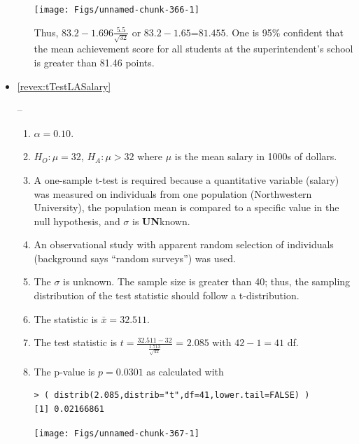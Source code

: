 \documentclass[10pt,openany]{book}\usepackage[]{graphicx}\usepackage[]{color}
\makeatletter
\newenvironment{kframe}{%
 \def\at@end@of@kframe{}%
 \ifinner\ifhmode%
  \def\at@end@of@kframe{\end{minipage}}%
  \begin{minipage}{\columnwidth}%
 \fi\fi%
 \def\FrameCommand##1{\hskip\@totalleftmargin \hskip-\fboxsep
 \colorbox{shadecolor}{##1}\hskip-\fboxsep
     \hskip-\linewidth \hskip-\@totalleftmargin \hskip\columnwidth}%
 \MakeFramed {\advance\hsize-\width
   \@totalleftmargin\z@ \linewidth\hsize
   \@setminipage}}%
 {\par\unskip\endMakeFramed%
 \at@end@of@kframe}
\newenvironment{knitrout}{}{} %
\makeatother
\begin{document}
\begin{itemize}
\begin{enumerate}
\begin{knitrout}
{\centering \texttt{[image: Figs/unnamed-chunk-366-1]} 

}



\end{knitrout}
Thus, $83.2-1.696\frac{5.5}{\sqrt{32}}$ or $83.2-1.65$=$81.455$.  One is 95\% confident that the mean achievement score for all students at the superintendent's school is greater than 81.46 points.
    \end{enumerate}
  \item \hypertarget{ans:tTestLASalary}{\ref{revex:tTestLASalary}} --
    \begin{enumerate}
      \item $\alpha=0.10$.
      \item $H_{O}:\mu=32$, $H_{A}:\mu>32$ where $\mu$ is the mean salary in 1000s of dollars.
      \item A one-sample t-test is required because a quantitative variable (salary) was measured on individuals from one population (Northwestern University), the population mean is compared to a specific value in the null hypothesis, and $\sigma$ is \textbf{UN}known.
      \item An observational study with apparent random selection of individuals (background says ``random surveys'') was used.
      \item The $\sigma$ is unknown.  The sample size is greater than 40; thus, the sampling distribution of the test statistic should follow a t-distribution.
      \item The statistic is $\bar{x}=32.511$.
      \item The test statistic is $t=\frac{32.511-32}{\frac{1.713}{\sqrt{42}}}$ = $2.085$ with $42-1=41$ df.
      \item The p-value is $p=0.0301$ as calculated with
\begin{knitrout}
\color{fgcolor}\begin{kframe}
\begin{verbatim}
> ( distrib(2.085,distrib="t",df=41,lower.tail=FALSE) )
[1] 0.02166861
\end{verbatim}
\end{kframe}

{\centering \texttt{[image: Figs/unnamed-chunk-367-1]} 

}




\end{knitrout}
\end{enumerate}
\end{itemize}
\end{document}
